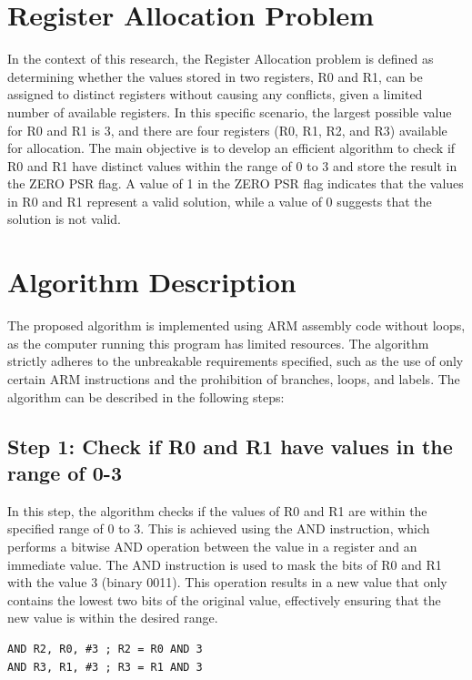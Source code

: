 




\section{Register Allocation Problem}
In the context of this research, the Register Allocation problem is defined as determining whether the values stored in two registers, R0 and R1, can be assigned to distinct registers without causing any conflicts, given a limited number of available registers. In this specific scenario, the largest possible value for R0 and R1 is 3, and there are four registers (R0, R1, R2, and R3) available for allocation. The main objective is to develop an efficient algorithm to check if R0 and R1 have distinct values within the range of 0 to 3 and store the result in the ZERO PSR flag. A value of 1 in the ZERO PSR flag indicates that the values in R0 and R1 represent a valid solution, while a value of 0 suggests that the solution is not valid.

\section{Algorithm Description}
The proposed algorithm is implemented using ARM assembly code without loops, as the computer running this program has limited resources. The algorithm strictly adheres to the unbreakable requirements specified, such as the use of only certain ARM instructions and the prohibition of branches, loops, and labels. The algorithm can be described in the following steps:

\subsection{Step 1: Check if R0 and R1 have values in the range of 0-3}
In this step, the algorithm checks if the values of R0 and R1 are within the specified range of 0 to 3. This is achieved using the AND instruction, which performs a bitwise AND operation between the value in a register and an immediate value. The AND instruction is used to mask the bits of R0 and R1 with the value 3 (binary 0011). This operation results in a new value that only contains the lowest two bits of the original value, effectively ensuring that the new value is within the desired range.

\begin{verbatim}
AND R2, R0, #3 ; R2 = R0 AND 3
AND R3, R1, #3 ; R3 = R1 AND 3
\end{verbatim}


